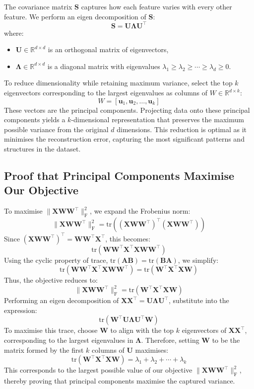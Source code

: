 The covariance matrix $\bm{S}$ captures how each feature varies with every other feature. We perform an eigen decomposition of $\bm{S}$:
\[
    \bm{S} = \bm{U} \bm{\Lambda} \bm{U}^\top
\]
where:
\begin{itemize}
    \item $\bm{U} \in \mathbb{R}^{d \times d}$ is an orthogonal matrix of eigenvectors,
    \item $\bm{\Lambda} \in \mathbb{R}^{d \times d}$ is a diagonal matrix with eigenvalues $\lambda_{1} \geq \lambda_{2} \geq \cdots \geq \lambda_{d} \geq 0$.
\end{itemize}

To reduce dimensionality while retaining maximum variance, select the top $k$ eigenvectors corresponding to the largest eigenvalues as columns of $W \in \mathbb{R}^{d \times k}$:
\[
    W = [\mathbf{u}_1, \mathbf{u}_2, \ldots, \mathbf{u}_k]
\]
These vectors are the principal components. Projecting data onto these principal components yields a $k$-dimensional representation that preserves the maximum possible variance from the original $d$ dimensions. This reduction is optimal as it minimises the reconstruction error, capturing the most significant patterns and structures in the dataset.

\subsection{Proof that Principal Components Maximise Our Objective}

To maximise $\| \bm{X}\bm{W}\bm{W}^\top \|_{\mathrm{F}}^{2}$, we expand the Frobenius norm:
\[
    \| \bm{X}\bm{W}\bm{W}^\top \|_{\mathrm{F}}^{2} = \mathrm{tr}\left( (\bm{X}\bm{W}\bm{W}^\top)^\top (\bm{X}\bm{W}\bm{W}^\top) \right)
\]
Since $(\bm{X}\bm{W}\bm{W}^\top)^\top = \bm{W}\bm{W}^\top \bm{X}^\top$, this becomes:
\[
    \mathrm{tr}(\bm{W}\bm{W}^\top \bm{X}^\top \bm{X} \bm{W}\bm{W}^\top)
\]
Using the cyclic property of trace, $\mathrm{tr}(\mathbf{AB}) = \mathrm{tr}(\mathbf{BA})$, we simplify:
\[
    \mathrm{tr}(\bm{W}\bm{W}^\top \bm{X}^\top \bm{X} \bm{W}\bm{W}^\top) = \mathrm{tr}(\bm{W}^\top \bm{X}^\top \bm{X} \bm{W})
\]
Thus, the objective reduces to:
\[
    \| \bm{X}\bm{W}\bm{W}^\top \|_{\mathrm{F}}^{2} = \mathrm{tr}(\bm{W}^\top \bm{X}^\top \bm{X} \bm{W})
\]
Performing an eigen decomposition of $\bm{X}\bm{X}^\top = \bm{U} \bm{\Lambda} \bm{U}^\top$, substitute into the expression:
\[
    \mathrm{tr}(\bm{W}^\top \bm{U} \bm{\Lambda} \bm{U}^\top \bm{W})
\]
To maximise this trace, choose $\bm{W}$ to align with the top $k$ eigenvectors of $\bm{X}\bm{X}^\top$, corresponding to the largest eigenvalues in $\bm{\Lambda}$. Therefore, setting $\bm{W}$ to be the matrix formed by the first $k$ columns of $\bm{U}$ maximises:
\[
    \mathrm{tr}(\bm{W}^\top \bm{X}^\top \bm{X} \bm{W}) = \lambda_{1} + \lambda_{2} + \cdots + \lambda_{k}
\]
This corresponds to the largest possible value of our objective $\| \bm{X}\bm{W}\bm{W}^\top \|_{\mathrm{F}}^{2}$, thereby proving that principal components maximise the captured variance.

